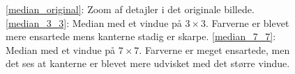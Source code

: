 {\begin{figure}[!h]
    \centering
    \hspace{1em}
    \hspace{1em}
    \caption[]{\ref{median_original}: Zoom af detajler i det originale
    billede. \ref{median_3_3}: Median med et vindue på $3\times{}3$.
    Farverne er blevet mere ensartede mens kanterne stadig er skarpe.
    \ref{median_7_7}: Median med et vindue på $7\times{}7$. Farverne er
    meget ensartede, men det ses at kanterne er blevet mere udvisket med
    det større vindue.}
    \label{median_metode}
\end{figure}

}

